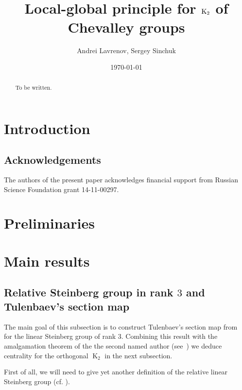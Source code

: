 \documentclass[12pt]{amsart}
\title{Local-global principle for $\K_2$ of Chevalley groups}
\author {Andrei Lavrenov, Sergey Sinchuk}
\date {\today}
\theoremstyle{plain} \declaretheorem[name=Theorem, Refname={Theorem,Theorems}]{thm} \Crefname{thm}{Theorem}{Theorems}
\numberwithin{equation}{section}
\theoremstyle{definition} \newtheorem{dfn}[lemma]{Definition} \Crefname{dfn}{Definition}{Definitions}
\theoremstyle{remark} \newtheorem{rem}[lemma]{Remark} \Crefname{rem}{Remark}{Remarks}
\newcommand{\K}{\operatorname{\mathrm{K}}}
\begin{document}
\begin{abstract} To be written. \end{abstract}

\maketitle

\section {Introduction}\label{intro}
 
\subsection{Acknowledgements}
The authors of the present paper acknowledges financial support from Russian Science Foundation grant 14-11-00297.

\section {Preliminaries}\label{prelim}

\section {Main results}

\subsection{Relative Steinberg group in rank $3$ and Tulenbaev's section map} 
The main goal of this subsection is to construct Tulenbaev's section map from~\cite[\S~2]{T} for
the linear Steinberg group of rank $3$. Combining this result with the amalgamation theorem
of the the second named author (see~\cite[Theorem~9]{S15}) we deduce centrality for the orthogonal
$\K_2$ in the next subsection.

First of all, we will need to give yet another definition of the relative linear Steinberg group 
(cf. \cite[Definitions~3.3 and 3.7]{S15}).
\end{document}
